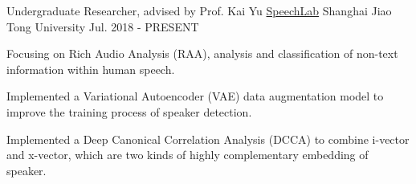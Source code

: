 \begin{cventries}
	\cventry
	{Undergraduate Researcher, advised by Prof. Kai Yu}
	{\href{https://speechlab.sjtu.edu.cn/}{SpeechLab}}
	{Shanghai Jiao Tong University}
	{Jul. 2018 - PRESENT}
	{
		\begin{cvitems}
			\item {Focusing on Rich Audio Analysis (RAA), analysis and classification of non-text information within human speech.}
            \item {Implemented a Variational Autoencoder (VAE) data augmentation model to improve the training process of speaker detection.}
            \item {Implemented a Deep Canonical Correlation Analysis (DCCA) to combine i-vector and x-vector, which are two kinds of highly complementary embedding of speaker.}
		\end{cvitems}
	}
\end{cventries}
